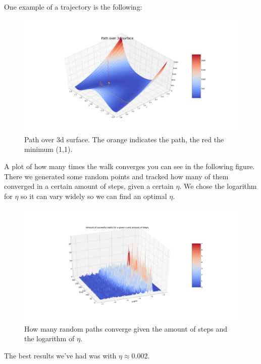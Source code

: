 \documentclass[a4paper]{article}
\begin{document}
\newpage

One example of a trajectory is the following:

\begin{figure}[H]
\hspace*{-6cm}
\includegraphics[width=1.5\textwidth]{Images/Path_over_3d_surface.png}
\caption{Path over 3d surface. The orange indicates the path, the red the minimum (1,1). }
\end{figure}

A plot of how many times the walk converges you can see in the following figure. There we generated some random points and tracked how many of them converged in a certain amount of steps, given a certain $\eta$.
We chose the logarithm for $\eta$ so it can vary widely so we can find an optimal $\eta$.

\begin{figure}[H]
\hspace*{-6cm}
\includegraphics[width=1.5\textwidth]{Images/3dError.png}
\caption{How many random paths converge given the amount of steps and the logarithm of $\eta$.}
\end{figure}

The best results we've had was with  $\eta \approx 0.002$.
\end{document}
